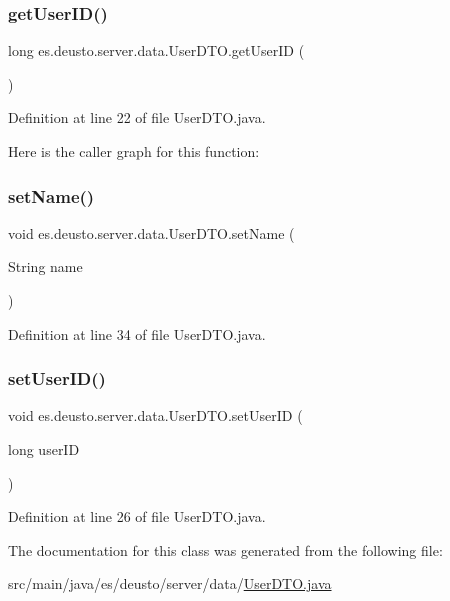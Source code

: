\subsubsection{\texorpdfstring{getUserID()}{getUserID()}}
{\footnotesize\ttfamily long es.\+deusto.\+server.\+data.\+User\+D\+T\+O.\+get\+User\+ID (\begin{DoxyParamCaption}{ }\end{DoxyParamCaption})}



Definition at line 22 of file User\+D\+T\+O.\+java.

Here is the caller graph for this function\+:
\mbox{\label{classes_1_1deusto_1_1server_1_1data_1_1_user_d_t_o_a15f7773676e2cca068e63f604fb61ab0}} 
\subsubsection{\texorpdfstring{setName()}{setName()}}
{\footnotesize\ttfamily void es.\+deusto.\+server.\+data.\+User\+D\+T\+O.\+set\+Name (\begin{DoxyParamCaption}\item[{String}]{name }\end{DoxyParamCaption})}



Definition at line 34 of file User\+D\+T\+O.\+java.

\mbox{\label{classes_1_1deusto_1_1server_1_1data_1_1_user_d_t_o_ad96e17b7c2a478f263f7a7b8bf7dde14}} 
\subsubsection{\texorpdfstring{setUserID()}{setUserID()}}
{\footnotesize\ttfamily void es.\+deusto.\+server.\+data.\+User\+D\+T\+O.\+set\+User\+ID (\begin{DoxyParamCaption}\item[{long}]{user\+ID }\end{DoxyParamCaption})}



Definition at line 26 of file User\+D\+T\+O.\+java.



The documentation for this class was generated from the following file\+:\begin{DoxyCompactItemize}
\item 
src/main/java/es/deusto/server/data/\mbox{\hyperlink{_user_d_t_o_8java}{User\+D\+T\+O.\+java}}\end{DoxyCompactItemize}
